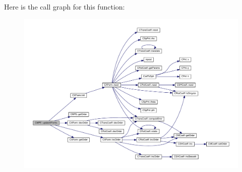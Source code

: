 Here is the call graph for this function\-:
\nopagebreak
\begin{figure}[H]
\begin{center}
\leavevmode
\includegraphics[width=350pt]{classCMPE_a65d2f19a87b451dbd84bb4b11cbfd571_cgraph}
\end{center}
\end{figure}




